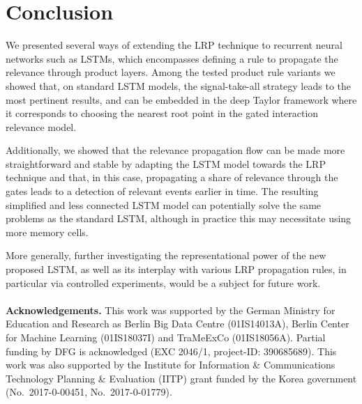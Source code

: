\documentclass[runningheads]{llncs}
\begin{document}
\FloatBarrier

\section{Conclusion}
We presented several ways of extending the LRP technique to recurrent neural networks such as LSTMs, which encompasses defining a rule to propagate the relevance through product layers.
Among the tested product rule variants we showed that, on standard LSTM models, the signal-take-all strategy leads to the most pertinent results,
and can be embedded in the deep Taylor framework where it corresponds to choosing the nearest root point in the gated interaction relevance model.

Additionally, we showed that the relevance propagation flow can be made more straightforward and stable by adapting the LSTM model towards the LRP technique
and that, in this case, propagating a share of relevance through the gates leads to a detection of relevant events earlier in time.
The resulting simplified and less connected LSTM model can potentially solve the same problems as the standard LSTM, although in practice this may necessitate using more memory cells.

More generally, further investigating the representational power of the new proposed LSTM, as well as its interplay with various LRP propagation rules, in particular via controlled experiments, would be a subject for future work.\\\\
{\bf Acknowledgements.} This work was supported by the German Ministry for Education and Research as Berlin Big Data Centre (01IS14013A), Berlin Center for Machine Learning (01IS18037I) and TraMeExCo (01IS18056A). Partial funding by DFG is acknowledged (EXC 2046/1, project-ID: 390685689). This work was also supported by the Institute for Information \& Communications Technology Planning \& Evaluation (IITP) grant funded by the Korea government (No.\ 2017-0-00451, No.\ 2017-0-01779).




\end{document}
